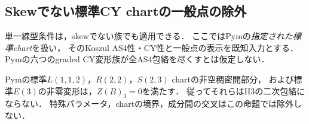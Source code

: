 \subsection{Skewでない標準CY chartの一般点の除外}
\label{sec:pym-generic-cubic-exclusions}
単一線型条件は，skewでない族でも適用できる．
ここではPym\cite[\S\S3.2--3.6]{Pym}の\emph{指定された標準chart}を扱い，
そのKoszul AS4性・CY性と一般点の表示を既知入力とする．
Pymの六つのgraded CY変形族が全AS4包絡を尽くすとは仮定しない．

\begin{proposition}
\label{prop:pym-four-generic-empty}
Pymの標準$L(1,1,2)$，$R(2,2)$，$S(2,3)$ chartの非空稠密開部分，
および標準$E(3)$の非零変形は，$Z(B)_3=0$を満たす．
従ってそれらはH3の二次包絡にならない．
特殊パラメータ，chartの境界，成分間の交叉はこの命題では除外しない．
\end{proposition}
